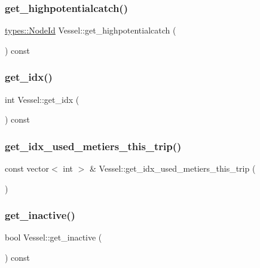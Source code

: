 \mbox{\label{class_vessel_a65f1903abb2e855f56e1990011fe17a1}} 
\subsubsection{\texorpdfstring{get\_highpotentialcatch()}{get\_highpotentialcatch()}}
{\footnotesize\ttfamily \mbox{\hyperlink{classtypes_1_1_node_id}{types\+::\+Node\+Id}} Vessel\+::get\+\_\+highpotentialcatch (\begin{DoxyParamCaption}{ }\end{DoxyParamCaption}) const}

\mbox{\label{class_vessel_a7c9871ffbb09b11564520a2ed682e3df}} 
\subsubsection{\texorpdfstring{get\_idx()}{get\_idx()}}
{\footnotesize\ttfamily int Vessel\+::get\+\_\+idx (\begin{DoxyParamCaption}{ }\end{DoxyParamCaption}) const}

\mbox{\label{class_vessel_aa9fb6e152000be882ad2ad19070f7565}} 
\subsubsection{\texorpdfstring{get\_idx\_used\_metiers\_this\_trip()}{get\_idx\_used\_metiers\_this\_trip()}}
{\footnotesize\ttfamily const vector$<$ int $>$ \& Vessel\+::get\+\_\+idx\+\_\+used\+\_\+metiers\+\_\+this\+\_\+trip (\begin{DoxyParamCaption}{ }\end{DoxyParamCaption})}

\mbox{\label{class_vessel_af2ed11c22dbf53160045be4d10546835}} 
\subsubsection{\texorpdfstring{get\_inactive()}{get\_inactive()}}
{\footnotesize\ttfamily bool Vessel\+::get\+\_\+inactive (\begin{DoxyParamCaption}{ }\end{DoxyParamCaption}) const}

